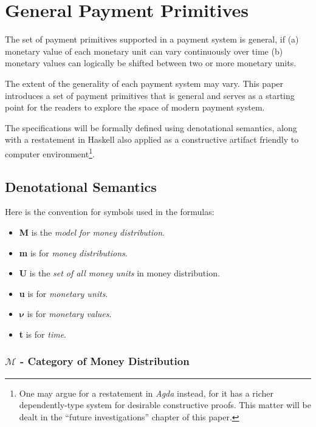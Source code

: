 \chapter{General Payment Primitives}

The set of payment primitives supported in a payment system is general, if (a) monetary value of
each monetary unit can vary continuously over time (b) monetary values can logically be shifted
between two or more monetary units.

The extent of the generality of each payment system may vary. This paper introduces a set of payment
primitives that is general and serves as a starting point for the readers to explore the space of
modern payment system.

The specifications will be formally defined using denotational semantics, along with a restatement
in Haskell also applied as a constructive artifact friendly to computer environment\footnote{One may
argue for a restatement in \textit{Agda} instead, for it has a richer dependently-type system for
desirable constructive proofs. This matter will be dealt in the ``future investigations'' chapter of
this paper.}.

\section{Denotational Semantics}

Here is the convention for symbols used in the formulas:

\begin{itemize}
\item \textbf{M} is the \textit{model for money distribution}.
\item \textbf{m} is for \textit{money distributions}.
\item \textbf{U} is the \textit{set of all money units} in money distribution.
\item \textbf{u} is for \textit{monetary units}.
\item $\boldsymbol{\nu}$ is for \textit{monetary values}.
\item \textbf{t} is for \textit{time}.
\end{itemize}

\subsection{$\mathcal{M}$ - Category of Money Distribution}

